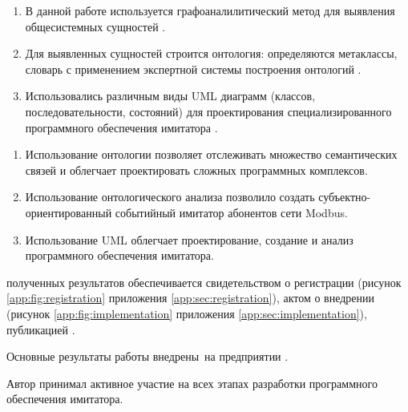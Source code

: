 {\methods}%
\begin{enumerate}
    \item В данной работе используется графоаналилитический метод для выявления общесистемных сущностей \cite{journal:vestnik_igeu:elizarova}.
    \item Для выявленных сущностей строится онтология: определяются метаклассы, словарь с применением экспертной системы построения онтологий \protege.
    \item Использовались различным виды UML диаграмм (классов, последовательности, состояний)
        для проектирования специализированного программного обеспечения имитатора \cite{book:oop:oop_analize}.
\end{enumerate}

{}
\begin{enumerate}
  \item Использование онтологии позволяет отслеживать множество семантических связей и облегчает проектировать сложных программных комплексов.
  \item Использование онтологического анализа позволило создать субъектно-ориентированный событийный имитатор абонентов сети Modbus.
  \item Использование UML облегчает проектирование, создание и анализ программного обеспечения имитатора.
\end{enumerate}

{\reliability} полученных результатов обеспечивается
  свидетельством о регистрации (рисунок \ref{app:fig:registration} приложения \ref{app:sec:registration}),
  актом о внедрении (рисунок \ref{app:fig:implementation} приложения \ref{app:sec:implementation}),  
  публикацией \cite{bib:my:ttd_with_patterns_2019}.


{\probation} Основные результаты работы внедрены~на предприятии \leadingOrganizationTitle.

{\contribution} Автор принимал активное участие на всех этапах разработки программного обеспечения имитатора.

